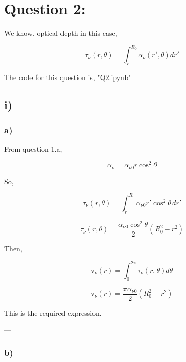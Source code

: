 \documentclass{article}
\begin{document}
\section{Question 2:}

We know, optical depth in this case,

\begin{equation}
\tau_\nu(r,\theta)=\int_r^{R_0}\alpha_\nu(r',\theta)dr'
\end{equation}

The code for this question is, "Q2.ipynb"
\subsection{i)}

\subsubsection{a)}

From question 1.a,

\begin{equation}
\alpha_\nu=\alpha_{\nu 0} r\cos^2\theta
\end{equation}

So,

\begin{equation}
\tau_\nu(r,\theta)=\int_r^{R_0}\alpha_{\nu 0} r' \cos^2\theta \,dr'
\end{equation}

\begin{equation}
\tau_\nu(r,\theta)=\frac{\alpha_{\nu 0}\cos^2\theta}{2}(R_0^2-r^2)
\end{equation}

Then,

\begin{equation}
\tau_\nu(r)=\int_0^{2\pi}\tau_\nu(r,\theta)d\theta
\end{equation}

\begin{equation}
\boxed{
\tau_\nu(r)=\frac{\pi\alpha_{\nu 0}}{2}(R_0^2-r^2)
}
\end{equation}

This is the required expression.

---

\subsubsection{b)}
\end{document}
